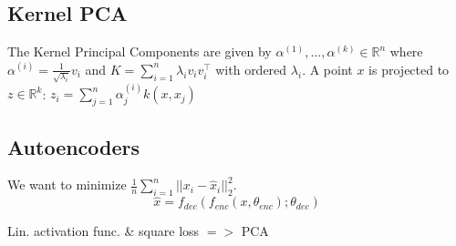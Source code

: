\subsection*{Kernel PCA}

The Kernel Principal Components are given by $\alpha^{(1)},...,\alpha^{(k)}\in \mathbb{R}^n$ 
where $\alpha^{(i)} = \frac{1}{\sqrt{\lambda_i}}v_i$ and 
$K = \sum_{i=1}^n \lambda_i v_i v_i^\top$ with ordered $\lambda_i.$ A point 
$x$ is projected to $z \in \mathbb{R}^k$:
$z_i = \sum_{j=1}^n\alpha_j^{(i)}k(x,x_j)$

\subsection*{Autoencoders}

We want to minimize $\frac{1}{n}\sum_{i=1}^n ||x_i - \hat{x}_i||_2^2$.
$$\hat{x} = f_{dec}(f_{enc}(x, \theta_{enc}); \theta_{dec})$$

Lin. activation func. \& square loss $=>$ PCA